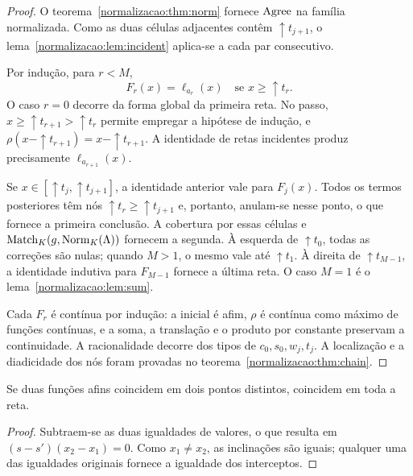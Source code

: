 \begin{proof}
O teorema~\ref{normalizacao:thm:norm} fornece $\operatorname{Agree}$ na família normalizada.
Como as duas células adjacentes contêm $\uparrow t_{j+1}$,
o lema~\ref{normalizacao:lem:incident} aplica-se a cada par consecutivo.

Por indução, para $r<M$,
\[
 F_r(x)=\ell_{a_r}(x)\quad\text{se }x\ge\uparrow t_r.
\]
O caso $r=0$ decorre da forma global da primeira reta.
No passo, $x\ge\uparrow t_{r+1}>\uparrow t_r$ permite empregar a
hipótese de indução, e
$\rho(x-\uparrow t_{r+1})=x-\uparrow t_{r+1}$. A identidade
de retas incidentes produz precisamente $\ell_{a_{r+1}}(x)$.

Se $x\in[\uparrow t_j,\uparrow t_{j+1}]$, a identidade anterior
vale para $F_j(x)$. Todos os termos posteriores têm nós
$\uparrow t_r\ge\uparrow t_{j+1}$ e, portanto, anulam-se nesse
ponto, o que fornece a primeira conclusão. A cobertura por essas células
e $\operatorname{Match}_K(g,\operatorname{Norm}_K(\Lambda))$ fornecem a segunda.
À esquerda de $\uparrow t_0$, todas as correções são nulas; quando
$M>1$, o mesmo vale até $\uparrow t_1$. À direita de
$\uparrow t_{M-1}$, a identidade indutiva para $F_{M-1}$ fornece a
última reta. O caso $M=1$ é o lema~\ref{normalizacao:lem:sum}.

Cada $F_r$ é contínua por indução: a inicial é afim, $\rho$ é
contínua como máximo de funções contínuas, e a soma, a translação e o
produto por constante preservam a continuidade. A racionalidade
decorre dos tipos de $c_0,s_0,w_j,t_j$. A localização e a diadicidade
dos nós foram provadas no teorema~\ref{normalizacao:thm:chain}.
\end{proof}

\begin{lema}\label{map:normalizacao:8.5}\label{normalizacao:lem:two_points}
Se duas funções afins coincidem em dois pontos distintos, coincidem
em toda a reta.
\end{lema}
\begin{proof}
Subtraem-se as duas igualdades de valores, o que resulta em
$(s-s')(x_2-x_1)=0$. Como $x_1\ne x_2$, as inclinações são
iguais; qualquer uma das igualdades originais fornece a igualdade dos
interceptos.
\end{proof}

